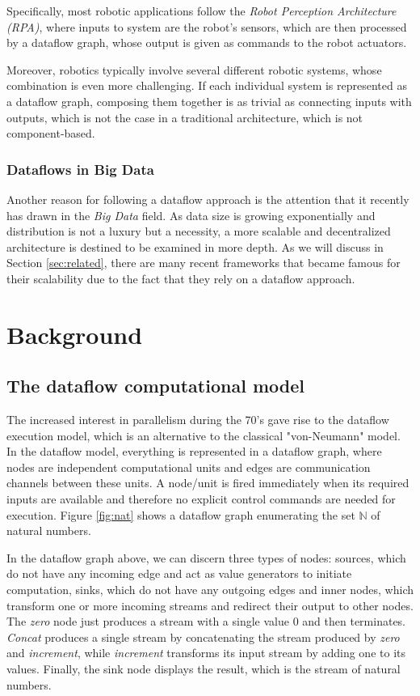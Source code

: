 \documentclass[sigplan,review,anonymous]{acmart}
\begin{document}
Specifically, most robotic applications follow the \textit{Robot Perception
Architecture (RPA)}, where inputs to system are the robot's sensors, which are
then processed by a dataflow graph, whose output is given as commands to the
robot actuators.

Moreover, robotics typically involve several different robotic systems, whose
combination is even more challenging. If each individual system is represented
as a dataflow graph, composing them together is as trivial as connecting inputs
with outputs, which is not the case in a traditional architecture, which is not
component-based.

\subsubsection{Dataflows in Big Data}

Another reason for following a dataflow approach is the attention that it
recently has drawn in the \textit{Big Data} field. As data size is growing
exponentially and distribution is not a luxury but a necessity, a more scalable
and decentralized architecture is destined to be examined in more depth. As we
will discuss in Section \ref{sec:related}, there are many recent frameworks that
became famous for their scalability due to the fact that they rely on a dataflow
approach.

\section{Background} \label{sec:background}

\subsection{The dataflow computational model} The increased interest in
parallelism during the 70's gave rise to the dataflow execution model, which is
an alternative to the classical "von-Neumann" model. In the dataflow model,
everything is represented in a dataflow graph, where nodes are independent
computational units  and edges are communication channels between these units. A
node/unit is fired immediately when its required inputs are available and
therefore no explicit control commands are needed for execution. Figure
\ref{fig:nat} shows a dataflow graph enumerating the set $\mathbb{N}$ of natural
numbers.


In the dataflow graph above, we can discern three types of nodes: sources, which
do not have any incoming edge and act as value generators to initiate
computation, sinks, which do not have any outgoing edges and inner nodes, which
transform one or more incoming streams and redirect their output to other nodes.
The \textit{zero} node just produces a stream with a single value 0 and then
terminates. \textit{Concat} produces a single stream by concatenating the stream
produced by \textit{zero} and \textit{increment}, while \textit{increment}
transforms its input stream by adding one to its values. Finally, the sink node
displays the result, which is the stream of natural numbers.
\end{document}
